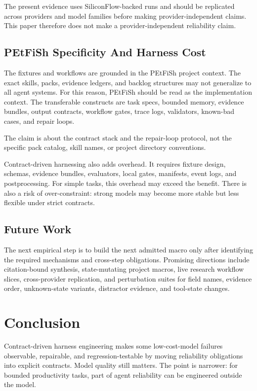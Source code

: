 \documentclass[11pt]{article}
\begin{document}
The present evidence uses SiliconFlow-backed runs and should be replicated across providers and model families before making provider-independent claims. This paper therefore does not make a provider-independent reliability claim.

\subsection{PEtFiSh Specificity And Harness Cost}

The fixtures and workflows are grounded in the PEtFiSh project context. The exact skills, packs, evidence ledgers, and backlog structures may not generalize to all agent systems. For this reason, PEtFiSh should be read as the implementation context. The transferable constructs are task specs, bounded memory, evidence bundles, output contracts, workflow gates, trace logs, validators, known-bad cases, and repair loops.

The claim is about the contract stack and the repair-loop protocol, not the specific pack catalog, skill names, or project directory conventions.

Contract-driven harnessing also adds overhead. It requires fixture design, schemas, evidence bundles, evaluators, local gates, manifests, event logs, and postprocessing. For simple tasks, this overhead may exceed the benefit. There is also a risk of over-constraint: strong models may become more stable but less flexible under strict contracts.

\subsection{Future Work}

The next empirical step is to build the next admitted macro only after identifying the required mechanisms and cross-step obligations. Promising directions include citation-bound synthesis, state-mutating project macros, live research workflow slices, cross-provider replication, and perturbation suites for field names, evidence order, unknown-state variants, distractor evidence, and tool-state changes.

\section{Conclusion}

Contract-driven harness engineering makes some low-cost-model failures observable, repairable, and regression-testable by moving reliability obligations into explicit contracts. Model quality still matters. The point is narrower: for bounded productivity tasks, part of agent reliability can be engineered outside the model.
\end{document}

